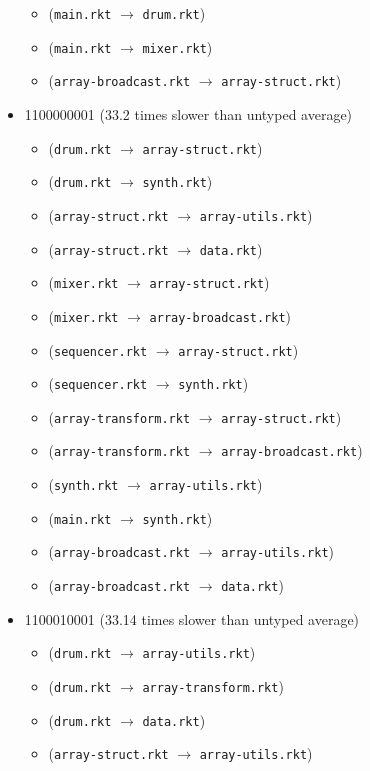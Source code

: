 \documentclass{article}
\newcommand{\mono}[1]{\texttt{#1}}
\begin{document}
\begin{itemize}
\begin{itemize}
  \item (\mono{main.rkt} $\rightarrow$ \mono{drum.rkt})
  \item (\mono{main.rkt} $\rightarrow$ \mono{mixer.rkt})
  \item (\mono{array-broadcast.rkt} $\rightarrow$ \mono{array-struct.rkt})
  \end{itemize}
\item 1100000001 (33.2 times slower than untyped average)
  \begin{itemize}
  \item (\mono{drum.rkt} $\rightarrow$ \mono{array-struct.rkt})
  \item (\mono{drum.rkt} $\rightarrow$ \mono{synth.rkt})
  \item (\mono{array-struct.rkt} $\rightarrow$ \mono{array-utils.rkt})
  \item (\mono{array-struct.rkt} $\rightarrow$ \mono{data.rkt})
  \item (\mono{mixer.rkt} $\rightarrow$ \mono{array-struct.rkt})
  \item (\mono{mixer.rkt} $\rightarrow$ \mono{array-broadcast.rkt})
  \item (\mono{sequencer.rkt} $\rightarrow$ \mono{array-struct.rkt})
  \item (\mono{sequencer.rkt} $\rightarrow$ \mono{synth.rkt})
  \item (\mono{array-transform.rkt} $\rightarrow$ \mono{array-struct.rkt})
  \item (\mono{array-transform.rkt} $\rightarrow$ \mono{array-broadcast.rkt})
  \item (\mono{synth.rkt} $\rightarrow$ \mono{array-utils.rkt})
  \item (\mono{main.rkt} $\rightarrow$ \mono{synth.rkt})
  \item (\mono{array-broadcast.rkt} $\rightarrow$ \mono{array-utils.rkt})
  \item (\mono{array-broadcast.rkt} $\rightarrow$ \mono{data.rkt})
  \end{itemize}
\item 1100010001 (33.14 times slower than untyped average)
  \begin{itemize}
  \item (\mono{drum.rkt} $\rightarrow$ \mono{array-utils.rkt})
  \item (\mono{drum.rkt} $\rightarrow$ \mono{array-transform.rkt})
  \item (\mono{drum.rkt} $\rightarrow$ \mono{data.rkt})
  \item (\mono{array-struct.rkt} $\rightarrow$ \mono{array-utils.rkt})

\end{itemize}
\end{itemize}
\end{document}
